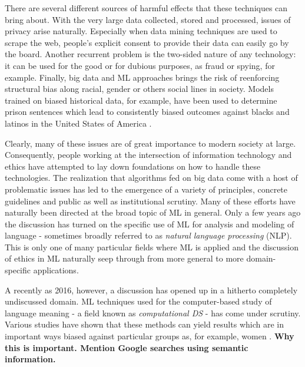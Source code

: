 \documentclass{article}
\begin{document}
There are several different sources of harmful effects that these techniques can bring about. With the very large data collected, stored and processed, issues of privacy arise naturally. Especially when data mining techniques are used to scrape the web, people's explicit consent to provide their data can easily go by the board. Another recurrent problem is the two-sided nature of any technology: it can be used for the good or for dubious purposes, as fraud or spying, for example. Finally, big data and ML approaches brings the risk of reenforcing structural bias along racial, gender or others social lines in society. Models trained on biased historical data, for example, have been used to determine prison sentences which lead to consistently biased outcomes against blacks and latinos in the United States of America \cite{angwin2016machine}.

Clearly, many of these issues are of great importance to modern society at large. Consequently, people working at the intersection of information technology and ethics have attempted to lay down foundations on how to handle these technologies. The realization that algorithms fed on big data come with a host of problematic issues has led to the emergence of a variety of principles, concrete guidelines and public as well as institutional scrutiny. Many of these efforts have naturally been directed at the broad topic of ML in general.\cite{leidner2017ehtical} Only a few years ago the discussion has turned on the specific use of ML for analysis and modeling of language - sometimes broadly referred to as \emph{natural language processing} (NLP). This is only one of many particular fields where ML is applied and the discussion of ethics in ML naturally seep through from more general to more domain-specific applications. 

A recently as 2016, however, a discussion has opened up in a hitherto completely undiscussed domain. ML techniques used for the computer-based study of language meaning - a field known as \emph{computational DS} - has come under scrutiny.
Various studies have shown that these methods can  yield results which are in important ways biased against particular groups as, for example, women \cite{google} \cite{wagner2015s}.
\textbf{Why this is important. Mention Google searches using semantic information.} 
\end{document}
